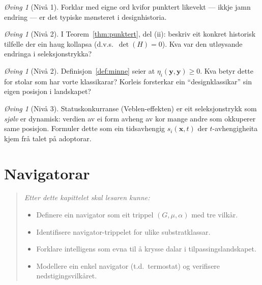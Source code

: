 \documentclass[10pt]{book}
\theoremstyle{definition}
\theoremstyle{plain}
\theoremstyle{remark}
\newtheorem{exercise}[definisjon]{\O{}ving}
\begin{document}
\begin{exercise}[Niv\aa{} 1]\label{ex:4.2}
Forklar med eigne ord kvifor punktert likevekt --- ikkje jamn endring --- er det typiske m\o nsteret i designhistoria.
\end{exercise}

\begin{exercise}[Niv\aa{} 2]\label{ex:4.3}
I Teorem~\ref{thm:punktert}, del (ii): beskriv eit konkret historisk tilfelle der ein haug kollapsa (d.v.s.\ $\det(H) = 0$). Kva var den utl\o ysande endringa i seleksjonstrykka?
\end{exercise}

\begin{exercise}[Niv\aa{} 2]\label{ex:4.4}
Definisjon~\ref{def:minne} seier at $\eta_i(\bm{y}, \bm{y}) \geq 0$. Kva betyr dette for stolar som har vorte klassikarar? Korleis forsterkar ein ``designklassikar'' sin eigen posisjon i landskapet?
\end{exercise}

\begin{exercise}[Niv\aa{} 3]\label{ex:4.5}
Statuskonkurranse (Veblen-effekten) er eit seleksjonstrykk som \emph{sj\o lv} er dynamisk: verdien av ei form avheng av kor mange andre som okkuperer same posisjon. Formuler dette som ein tidsavhengig $s_i(\bm{x}, t)$ der $t$-avhengigheita kjem fr\aa{} talet p\aa{} adoptorar.
\end{exercise}


\chapter{Navigatorar}\label{kap:navigatorar}

\begin{quote}\itshape
Etter dette kapittelet skal lesaren kunne:
\begin{itemize}[nosep]
\item Definere ein navigator som eit trippel $(G, \mu, \alpha)$ med tre vilk\aa r.
\item Identifisere navigator-trippelet for ulike substratklassar.
\item Forklare intelligens som evna til \aa{} krysse dalar i tilpassingslandskapet.
\item Modellere ein enkel navigator (t.d.\ termostat) og verifisere nedstigingsvilk\aa ret.
\end{itemize}
\end{quote}
\end{document}
